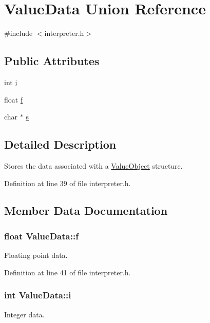 \hypertarget{union_value_data}{\section{Value\-Data Union Reference}
\label{union_value_data}
}


{\ttfamily \#include $<$interpreter.\-h$>$}

\subsection*{Public Attributes}
\begin{DoxyCompactItemize}
\item 
int \hyperlink{union_value_data_abc2f11fb39990140dbc322610ba52f70}{i}
\item 
float \hyperlink{union_value_data_a85311c11b54183bb571f35ed70af37a9}{f}
\item 
char $\ast$ \hyperlink{union_value_data_a2639b48549e0788d5f9a3da6ea9cb0e4}{s}
\end{DoxyCompactItemize}


\subsection{Detailed Description}
Stores the data associated with a \hyperlink{struct_value_object}{Value\-Object} structure. 

Definition at line 39 of file interpreter.\-h.



\subsection{Member Data Documentation}
\hypertarget{union_value_data_a85311c11b54183bb571f35ed70af37a9}{
\subsubsection[{f}]{\setlength{\rightskip}{0pt plus 5cm}float {\bf Value\-Data\-::f}}}\label{union_value_data_a85311c11b54183bb571f35ed70af37a9}
Floating point data. 

Definition at line 41 of file interpreter.\-h.

\hypertarget{union_value_data_abc2f11fb39990140dbc322610ba52f70}{
\subsubsection[{i}]{\setlength{\rightskip}{0pt plus 5cm}int {\bf Value\-Data\-::i}}}\label{union_value_data_abc2f11fb39990140dbc322610ba52f70}
Integer data. 

